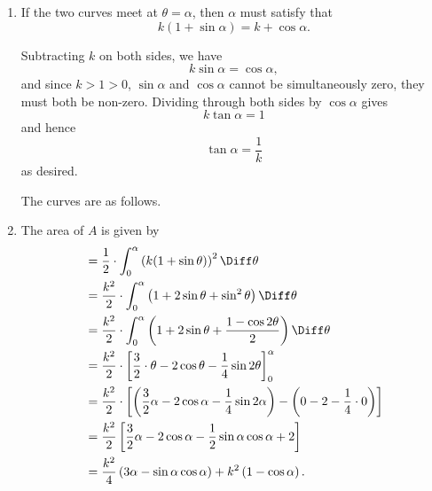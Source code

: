 \Question{\currfilebase}

\begin{enumerate}
    \item If the two curves meet at \(\theta = \alpha\), then \(\alpha\) must satisfy that
          \[
              k (1 + \sin \alpha) = k + \cos \alpha.
          \]

          Subtracting \(k\) on both sides, we have
          \[
              k \sin \alpha = \cos \alpha,
          \]
          and since \(k > 1 > 0\), \(\sin \alpha\) and \(\cos \alpha\) cannot be simultaneously zero, they must both be non-zero. Dividing through both sides by \(\cos \alpha\) gives
          \[
              k \tan \alpha = 1
          \]
          and hence
          \[
              \tan \alpha = \frac{1}{k}
          \]
          as desired.

          The curves are as follows.

          \begin{center}
              
          \end{center}

    \item The area of \(A\) is given by
          \begin{align*}
              [A] & = \frac{1}{2} \cdot \int_{0}^{\alpha} \left(k (1 + \sin \theta)\right)^2 \Diff \theta                                                                   \\
                  & = \frac{k^2}{2} \cdot \int_{0}^{\alpha} \left(1 + 2 \sin \theta + \sin^2 \theta\right) \Diff \theta                                                     \\
                  & = \frac{k^2}{2} \cdot \int_{0}^{\alpha} \left(1 + 2 \sin \theta + \frac{1 - \cos 2\theta}{2}\right) \Diff \theta                                        \\
                  & = \frac{k^2}{2} \cdot \left[\frac{3}{2} \cdot \theta - 2 \cos \theta - \frac{1}{4} \sin 2\theta\right]_{0}^{\alpha}                                     \\
                  & = \frac{k^2}{2} \cdot \left[\left(\frac{3}{2}\alpha - 2 \cos \alpha - \frac{1}{4} \sin 2\alpha\right) - \left(0 - 2 - \frac{1}{4} \cdot 0\right)\right] \\
                  & = \frac{k^2}{2} \left[\frac{3}{2}\alpha - 2 \cos \alpha - \frac{1}{2} \sin \alpha \cos \alpha + 2\right]                                                \\
                  & = \frac{k^2}{4} \left(3 \alpha - \sin \alpha \cos \alpha\right) + k^2 \left(1 - \cos \alpha\right).
          \end{align*}


\end{enumerate}
